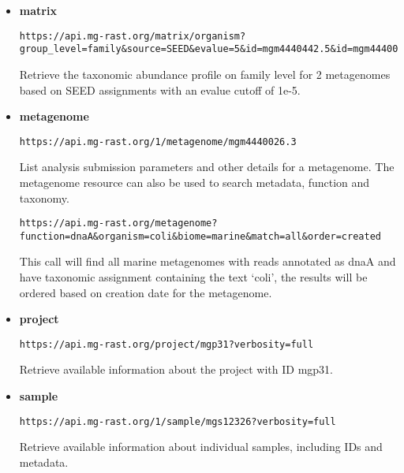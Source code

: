 \begin{itemize}
\item
\textbf{matrix}
\begin{small}
\begin{lstlisting}
https://api.mg-rast.org/matrix/organism?group_level=family&source=SEED&evalue=5&id=mgm4440442.5&id=mgm4440026.3
\end{lstlisting}
\end{small}
Retrieve the taxonomic abundance profile on family level for 2 metagenomes based on SEED assignments with an evalue cutoff of 1e-5.

\item
\textbf{metagenome}
\begin{small}
\begin{lstlisting}
https://api.mg-rast.org/1/metagenome/mgm4440026.3
\end{lstlisting}
\end{small} List analysis submission parameters and other details for a metagenome.
\newline
The metagenome resource can also be used to search metadata, function and taxonomy.
\begin{small}
\begin{lstlisting}
https://api.mg-rast.org/metagenome?function=dnaA&organism=coli&biome=marine&match=all&order=created
\end{lstlisting}
\end{small} This call will find all marine metagenomes with reads annotated as dnaA and have taxonomic assignment containing the text `coli', the results will be ordered based on creation date for the metagenome.

\item
\textbf{project}
\begin{small}
\begin{lstlisting}
https://api.mg-rast.org/project/mgp31?verbosity=full
\end{lstlisting}
\end{small} Retrieve available information about the project with ID mgp31.

\item
\textbf{sample}
\begin{small}
\begin{lstlisting}
https://api.mg-rast.org/1/sample/mgs12326?verbosity=full
\end{lstlisting}
\end{small} Retrieve available information about individual samples, including IDs and metadata.


\end{itemize}
